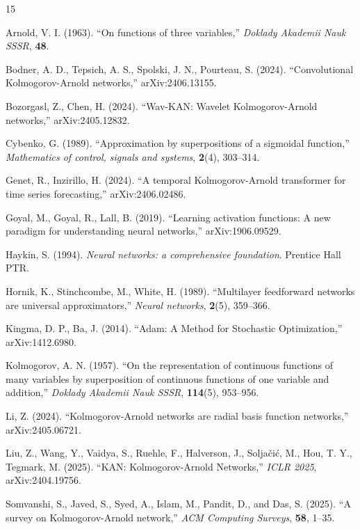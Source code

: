 \documentclass{article}
\theoremstyle{plain}
\theoremstyle{definition}
\theoremstyle{remark}
\begin{document}
\begin{thebibliography}{15}

Arnold, V. I. (1963). ``On functions of three variables,'' \emph{Doklady Akademii Nauk SSSR}, \textbf{48}.

Bodner, A. D., Tepsich, A. S., Spolski, J. N., Pourteau, S. (2024). ``Convolutional Kolmogorov-Arnold networks,'' arXiv:2406.13155.

Bozorgasl, Z., Chen, H. (2024). ``Wav-KAN: Wavelet Kolmogorov-Arnold networks,'' arXiv:2405.12832.

Cybenko, G. (1989). ``Approximation by superpositions of a sigmoidal function,'' \emph{Mathematics of control, signals and systems}, \textbf{2}(4), 303--314.

Genet, R., Inzirillo, H. (2024). ``A temporal Kolmogorov-Arnold transformer for time series forecasting,'' arXiv:2406.02486.

Goyal, M., Goyal, R., Lall, B. (2019). ``Learning activation functions: A new paradigm for understanding neural networks,'' arXiv:1906.09529.

Haykin, S. (1994). \emph{Neural networks: a comprehensive foundation}. Prentice Hall PTR.

Hornik, K., Stinchcombe, M., White, H. (1989). ``Multilayer feedforward networks are universal approximators,'' \emph{Neural networks}, \textbf{2}(5), 359--366.

Kingma, D. P., Ba, J. (2014). ``Adam: A Method for Stochastic Optimization,'' arXiv:1412.6980.

Kolmogorov, A. N. (1957). ``On the representation of continuous functions of many variables by superposition of continuous functions of one variable and addition,'' \emph{Doklady Akademii Nauk SSSR}, \textbf{114}(5), 953--956.

Li, Z. (2024). ``Kolmogorov-Arnold networks are radial basis function networks,'' arXiv:2405.06721.

Liu, Z., Wang, Y., Vaidya, S., Ruehle, F., Halverson, J., Solja\v{c}i\'{c}, M., Hou, T. Y., Tegmark, M. (2025).
``KAN: Kolmogorov-Arnold Networks,'' \emph{ICLR 2025}, arXiv:2404.19756.

Somvanshi, S., Javed, S., Syed, A., Islam, M., Pandit, D., and Das, S. (2025). ``A survey on Kolmogorov-Arnold network,'' \emph{ACM Computing Surveys}, \textbf{58}, 1--35.


\end{thebibliography}
\end{document}
